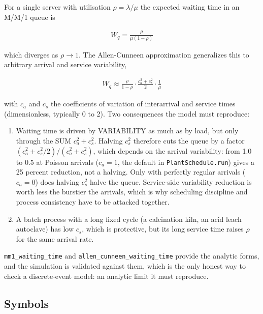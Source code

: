 \documentclass[10pt,a4paper,twoside]{report}
\begin{document}
For a single server with utilisation $\rho = \lambda / \mu$ the expected waiting time in an M/M/1 queue is

\begin{equation*}
\begin{gathered}
W_q = \frac{\rho}{\mu (1 - \rho)}
\end{gathered}
\end{equation*}

which diverges as $\rho \to 1$. The Allen-Cunneen approximation generalizes this to arbitrary arrival and service variability,

\begin{equation*}
\begin{gathered}
W_q \approx \frac{\rho}{1 - \rho} \cdot \frac{c_a^2 + c_s^2}{2} \cdot \frac{1}{\mu}
\end{gathered}
\end{equation*}

with $c_a$ and $c_s$ the coefficients of variation of interarrival and service times (dimensionless, typically 0 to 2). Two consequences the model must reproduce:

\begin{enumerate}[leftmargin=*,label=\arabic*.]
\item Waiting time is driven by VARIABILITY as much as by load, but only through the SUM $c_a^2 + c_s^2$. Halving $c_s^2$ therefore cuts the queue by a factor $(c_a^2 + c_s^2/2) / (c_a^2 + c_s^2)$, which depends on the arrival variability: from 1.0 to 0.5 at Poisson arrivals ($c_a = 1$, the default in \texttt{PlantSchedule.run}) gives a 25 percent reduction, not a halving. Only with perfectly regular arrivals ($c_a = 0$) does halving $c_s^2$ halve the queue. Service-side variability reduction is worth less the burstier the arrivals, which is why scheduling discipline and process consistency have to be attacked together.
\item A batch process with a long fixed cycle (a calcination kiln, an acid leach autoclave) has low $c_s$, which is protective, but its long service time raises $\rho$ for the same arrival rate.
\end{enumerate}

\texttt{mm1\_waiting\_time} and \texttt{allen\_cunneen\_waiting\_time} provide the analytic forms, and the simulation is validated against them, which is the only honest way to check a discrete-event model: an analytic limit it must reproduce.

\subsection*{Symbols}
\end{document}
